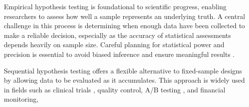 
Empirical hypothesis testing is foundational to scientific progress, enabling researchers
to assess how well a sample represents an underlying truth.
A central challenge in this process is determining when enough data have been collected
to make a reliable decision, especially as the accuracy of statistical assessments
depends heavily on sample size.  Careful planning for statistical power and precision
is essential to avoid biased inference and ensure meaningful results \citep{cohen1988}.

Sequential hypothesis testing offers a flexible alternative to fixed-sample designs
\citep{wald1947} by allowing data to be evaluated as it accumulates.
This approach is widely used in fields such as clinical trials
\citep{jennison2000, fda2010bayesian}, quality control, A/B testing \citep{johari2022}, and financial
monitoring,

